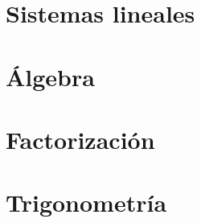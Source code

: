 \documentclass[
]{tufte-book}
\begin{document}
\chapter{Sistemas lineales}





\chapter{Álgebra}








\chapter{Factorización}







\chapter{Trigonometría}



%
{}

\end{document}
